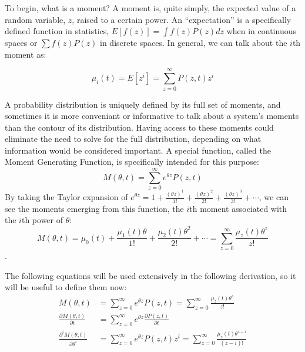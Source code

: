 \documentclass[a4paper,10pt]{article}
\begin{document}
To begin, what is a moment? A moment is, quite simply, the expected value of a random variable, $z$, raised to a certain power. An ``expectation'' is a specifically defined function in statistics, $E\left[f(z)\right]=\int f(z) P(z) dz$ when in continuous spaces or $\sum f(z) P(z)$ in discrete spaces. In general, we can talk about the $i$th moment as:

$$ \mu_i (t) = E\left[ z^i \right] = \sum_{z=0}^\infty P(z,t) z^i$$

 A probability distribution is uniquely defined by its full set of moments, and sometimes it is more conveniant or informative to talk about a system's moments than the contour of its distribution. Having access to these moments could eliminate the need to solve for the full distribution, depending on what information would be considered important. A special function, called the Moment Generating Function, is specifically intended for this purpose:
$$M(\theta, t)=\sum_{z=0}^\infty e^{\theta z} P(z,t)$$
By taking the Taylor expansion of $e^{\theta z}=1 + \frac{(\theta z)^1}{1!}+\frac{(\theta z)^2}{2!}+\frac{(\theta z)^3}{3!}+\cdots$, we can see the moments emerging from this function, the $i$th moment associated with the $i$th power of $\theta$:
$$M(\theta, t)=\mu_0(t)+\frac{\mu_{1}(t)\theta}{1!}+\frac{\mu_{2}(t)\theta^2}{2!}+\cdots=\sum_{z=0}^\infty \frac{\mu_z(t)\theta^z}{z!}$$.

The following equations will be used extensively in the following derivation, so it will be useful to define them now:
\begin{align}
 M(\theta, t)&=\sum_{z=0}^\infty e^{\theta z} P(z,t)=\sum_{z=0}^\infty \frac{\mu_z(t)\theta^z}{z!}\\
 \frac{\partial M(\theta, t)}{\partial t} &=\sum_{z=0}^\infty e^{\theta z} \frac{\partial P(z,t)}{\partial t}\\
  \frac{\partial^i M(\theta, t)}{\partial \theta^i} &=\sum_{z=0}^\infty e^{\theta z} P(z,t)  z^i=\sum_{z=0}^\infty \frac{\mu_z(t)\theta^{z-i}}{(z-i)!}
\end{align}
\end{document}
